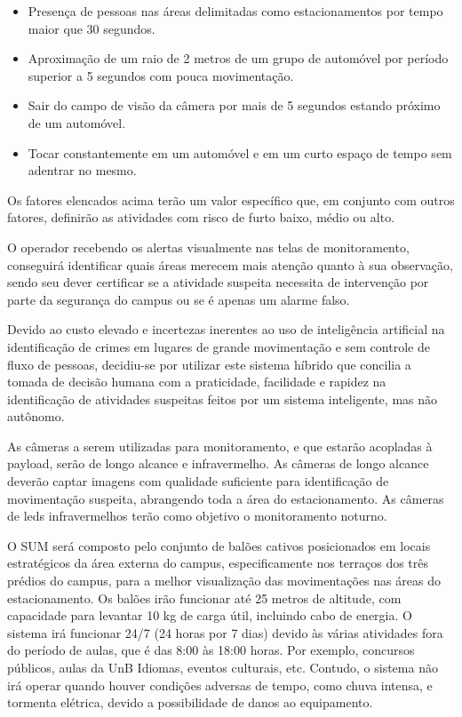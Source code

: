   \begin{itemize}
    \item Presença de pessoas nas áreas delimitadas como estacionamentos por tempo maior que 30 segundos.
    \item Aproximação de um raio de 2 metros de um grupo de automóvel por período superior a 5 segundos com pouca movimentação.
    \item Sair do campo de visão da câmera por mais de 5 segundos estando próximo de um automóvel.
    \item Tocar constantemente em um automóvel e em um curto espaço de tempo sem adentrar no mesmo.
  \end{itemize}

  Os fatores elencados acima terão um valor específico que, em conjunto com outros fatores, definirão as atividades com risco de furto baixo, médio ou alto.

  O operador recebendo os alertas visualmente nas telas de monitoramento, conseguirá identificar quais áreas merecem mais atenção quanto à sua observação, sendo seu dever certificar se a atividade suspeita necessita de intervenção por parte da segurança do campus ou se é apenas um alarme falso.

  Devido ao custo elevado e incertezas inerentes ao uso de inteligência artificial na identificação de crimes em lugares de grande movimentação e sem controle de fluxo de pessoas, decidiu-se por utilizar este sistema híbrido que concilia a tomada de decisão humana com a praticidade, facilidade e rapidez na identificação de atividades suspeitas feitos por um sistema inteligente, mas não autônomo.

  As câmeras a serem utilizadas para monitoramento, e que estarão acopladas à payload, serão de longo alcance e infravermelho.  As câmeras de longo alcance deverão captar imagens com qualidade suficiente para identificação de movimentação suspeita, abrangendo toda a área do estacionamento. As câmeras de leds infravermelhos terão como objetivo o monitoramento noturno.

  O SUM será composto pelo conjunto de balões cativos posicionados em locais estratégicos da área externa do campus, especificamente nos terraços dos três prédios do campus, para a melhor visualização das movimentações nas áreas do estacionamento. Os balões irão funcionar até 25 metros de altitude, com capacidade para levantar 10 kg de carga útil, incluindo cabo de energia. O sistema irá funcionar 24/7 (24 horas por 7 dias) devido às várias atividades fora do período de aulas, que é das 8:00 às 18:00 horas. Por exemplo, concursos públicos, aulas da UnB Idiomas, eventos culturais, etc. Contudo, o sistema não irá operar quando houver condições adversas de tempo, como chuva intensa, e tormenta elétrica, devido a possibilidade de danos ao equipamento.

